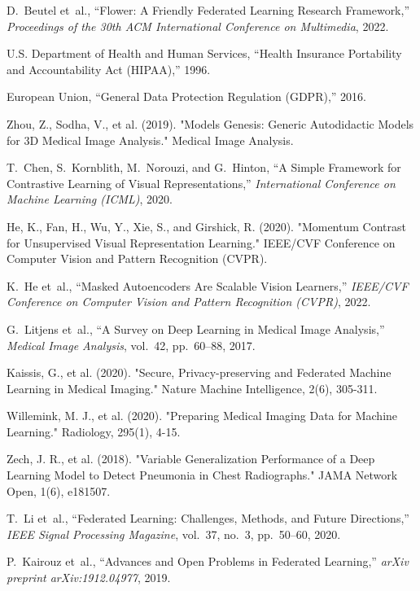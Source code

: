 \documentclass[a4paper, 10 pt, conference]{ieeeconf}
\begin{document}
\begin{thebibliography}{99}
D.~Beutel et~al., ``Flower: A Friendly Federated Learning Research Framework,'' \emph{Proceedings of the 30th ACM International Conference on Multimedia}, 2022.

U.S. Department of Health and Human Services, ``Health Insurance Portability and Accountability Act (HIPAA),'' 1996.

European Union, ``General Data Protection Regulation (GDPR),'' 2016.

Zhou, Z., Sodha, V., et al. (2019). "Models Genesis: Generic Autodidactic Models for 3D Medical Image Analysis." Medical Image Analysis.

T.~Chen, S.~Kornblith, M.~Norouzi, and G.~Hinton, ``A Simple Framework for Contrastive Learning of Visual Representations,'' \emph{International Conference on Machine Learning (ICML)}, 2020.

He, K., Fan, H., Wu, Y., Xie, S., and Girshick, R. (2020). "Momentum Contrast for Unsupervised Visual Representation Learning." IEEE/CVF Conference on Computer Vision and Pattern Recognition (CVPR).

K.~He et~al., ``Masked Autoencoders Are Scalable Vision Learners,'' \emph{IEEE/CVF Conference on Computer Vision and Pattern Recognition (CVPR)}, 2022.

G.~Litjens et~al., ``A Survey on Deep Learning in Medical Image Analysis,'' \emph{Medical Image Analysis}, vol.~42, pp.~60--88, 2017.

Kaissis, G., et al. (2020). "Secure, Privacy-preserving and Federated Machine Learning in Medical Imaging." Nature Machine Intelligence, 2(6), 305-311.

Willemink, M. J., et al. (2020). "Preparing Medical Imaging Data for Machine Learning." Radiology, 295(1), 4-15.

Zech, J. R., et al. (2018). "Variable Generalization Performance of a Deep Learning Model to Detect Pneumonia in Chest Radiographs." JAMA Network Open, 1(6), e181507.

T.~Li et~al., ``Federated Learning: Challenges, Methods, and Future Directions,'' \emph{IEEE Signal Processing Magazine}, vol.~37, no.~3, pp.~50--60, 2020.

P.~Kairouz et~al., ``Advances and Open Problems in Federated Learning,'' \emph{arXiv preprint arXiv:1912.04977}, 2019.


\end{thebibliography}
\end{document}

